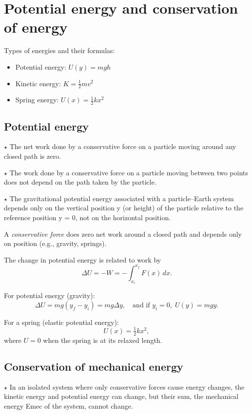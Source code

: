 \section{Potential energy and conservation of energy}

Types of energies and their formulas:
\begin{itemize}
    \item Potential energy: \( U(y) = mgh \)
    \item Kinetic energy: \( K = \frac{1}{2}mv^2 \)
    \item Spring energy: \( U(x) = \frac{1}{2}kx^2 \)
\end{itemize}

\subsection{Potential energy}
\noindent $\star$ The net work done by a conservative force on a particle moving around any closed path is zero.

\noindent $\star$ The work done by a conservative force on a particle moving between two points does not depend on the path taken by the particle.

\noindent $\star$ The gravitational potential energy associated with a particle–Earth system depends only on the vertical position y (or height) of the particle relative to the reference position y = 0, not on the horizontal position.

A \textit{conservative force} does zero net work around a closed path and depends only on position (e.g., gravity, springs).

The change in potential energy is related to work by
\[
\Delta U = -W = -\int_{x_i}^{x_f} F(x)\,dx.
\]

For potential energy (gravity):
\[
\Delta U = mg(y_f - y_i) = mg\Delta y, \quad \text{and if } y_i = 0, \; U(y) = mgy.
\]

For a spring (elastic potential energy):
\[
U(x) = \tfrac{1}{2}kx^2,
\]
where \( U = 0 \) when the spring is at its relaxed length.

\subsection{Conservation of mechanical energy}
\noindent $\star$ In an isolated system where only conservative forces cause energy changes, the
kinetic energy and potential energy can change, but their sum, the mechanical energy Emec of the system, cannot change.

